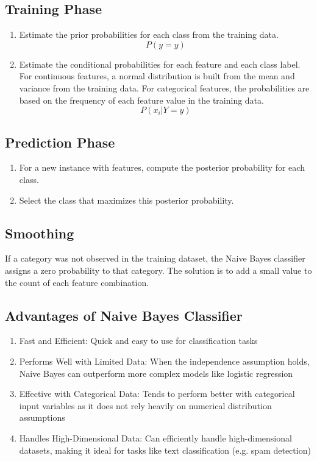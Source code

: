 \documentclass{article}
\begin{document}
\subsection*{Training Phase}
\begin{enumerate}
    \item Estimate the prior probabilities for each class from the training data.
    \[P(y=y)\]
    \item Estimate the conditional probabilities for each feature and each class label. For continuous features, a normal distribution is built from the mean and variance from the training data. For categorical features, the probabilities are based on the frequency of each feature value in the training data.
    \[P(x_i | Y=y)\]
\end{enumerate}

\subsection*{Prediction Phase}
\begin{enumerate}
    \item For a new instance with features, compute the posterior probability for each class.
    \item Select the class that maximizes this posterior probability.
\end{enumerate}

\subsection*{Smoothing}
If a category was not observed in the training dataset, the Naive Bayes classifier assigns a zero probability to that category. The solution is to add a small value to the count of each feature combination.

\subsection*{Advantages of Naive Bayes Classifier}
\begin{enumerate}
    \item Fast and Efficient: Quick and easy to use for classification tasks
    \item Performs Well with Limited Data: When the independence assumption holds, Naive Bayes can outperform more complex models like logistic regression
    \item Effective with Categorical Data: Tends to perform better with categorical input variables as it does not rely heavily on numerical distribution assumptions
    \item Handles High-Dimensional Data: Can efficiently handle high-dimensional datasets, making it ideal for tasks like text classification (e.g. spam detection)
\end{enumerate}
\end{document}
